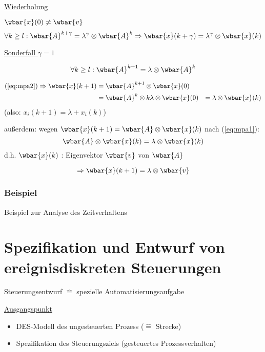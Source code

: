 \underline{Wiederholung}

\underline{$\wbar{x}(0) \neq \wbar{v}$}
\begin{equation}
	\forall k \ge l : \wbar{A}^{k+\gamma} = \lambda^\gamma \otimes \wbar{A}^k \Rightarrow \wbar{x}(k+\gamma) = \lambda^\gamma \otimes \wbar{x}(k)
\end{equation}

\underline{Sonderfall $\gamma=1$}

\begin{equation}
	\forall k \ge l : \wbar{A}^{k+1} = \lambda \otimes \wbar{A}^k
\end{equation}

\begin{align}
	(\ref{eq:mpa2}) \Rightarrow \wbar{x}(k+1) &= \wbar{A}^{k+1} \otimes \wbar{x}(0) \\
	&= \wbar{A}^k \otimes k \lambda \otimes \wbar{x}(0)
	&= \lambda \otimes \wbar{x}(k)
\end{align}
(also: $x_i(k+1) = \lambda + x_i(k)$)

außerdem: wegen $\wbar{x}(k+1) = \wbar{A} \otimes \wbar{x}(k)$ nach (\ref{eq:mpa1}):
\begin{equation}
	\wbar{A} \otimes \wbar{x}(k) = \lambda \otimes \wbar{x}(k)
\end{equation}
d.h. $\wbar{x}(k)$ : Eigenvektor $\wbar{v}$ von $\wbar{A}$

\begin{equation}
	\Rightarrow \wbar{x}(k+1) = \lambda \otimes \wbar{v}
\end{equation}

\subsubsection{Beispiel}
Beispiel zur Analyse des Zeitverhaltens 



\section{Spezifikation und Entwurf von ereignisdiskreten Steuerungen}
Steuerungsentwurf $\hat{=}$ spezielle Automatisierungsaufgabe 

\underline{Ausgangspunkt}
\begin{itemize}
	\item DES-Modell des ungesteuerten Prozess ($\hat{=}$ Strecke)
	\item Spezifikation des Steuerungsziels (gesteuertes Prozessverhalten)
\end{itemize}

